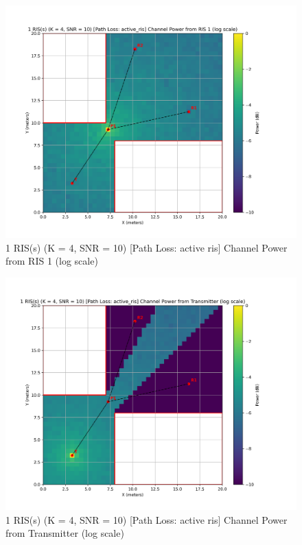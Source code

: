 \begin{figure}[H]
  \centering
  \includegraphics[width=0.8\linewidth]{imgs/heatmap-simulations/1 RIS(s) (K = 4, SNR = 10) [Path Loss_ active_ris] Channel Power from RIS 1 (log scale).png}
  \caption{1 RIS(s) (K = 4, SNR = 10) [Path Loss: active ris] Channel Power from RIS 1 (log scale)}
\end{figure}

\begin{figure}[H]
  \centering
  \includegraphics[width=0.8\linewidth]{imgs/heatmap-simulations/1 RIS(s) (K = 4, SNR = 10) [Path Loss_ active_ris] Channel Power from Transmitter (log scale).png}
  \caption{1 RIS(s) (K = 4, SNR = 10) [Path Loss: active ris] Channel Power from Transmitter (log scale)}
\end{figure}

